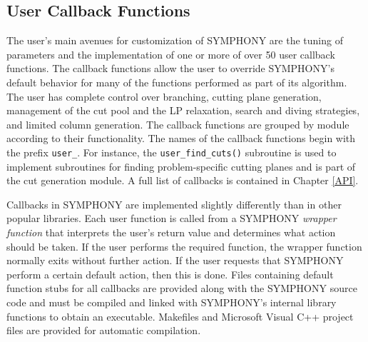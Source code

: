 \subsection{User Callback Functions}\label{callback}

The user's main avenues for customization of SYMPHONY are the tuning of
parameters and the implementation of one or more of over 50 user callback
functions. The callback functions allow the user to override SYMPHONY's
default behavior for many of the functions performed as part of its algorithm.
The user has complete control over branching, cutting plane generation,
management of the cut pool and the LP relaxation, search and diving
strategies, and limited column generation. The callback functions are grouped
by module according to their functionality. The names of the callback
functions begin with the prefix \texttt{user\_}. For instance, the
\texttt{user\_find\_cuts()} subroutine is used to implement subroutines for
finding problem-specific cutting planes and is part of the cut generation
module. A full list of callbacks is contained in Chapter \ref{API}.

Callbacks in SYMPHONY are implemented slightly differently than in other
popular libraries. Each user function is called from a SYMPHONY \emph{wrapper
function} that interprets the user's return value and determines what action
should be taken. If the user performs the required function, the wrapper
function normally exits without further action. If the user requests that
SYMPHONY perform a certain default action, then this is done. Files containing
default function stubs for all callbacks are provided along with the SYMPHONY
source code and must be compiled and linked with SYMPHONY's internal library
functions to obtain an executable. Makefiles and Microsoft Visual C++ project
files are provided for automatic compilation.
